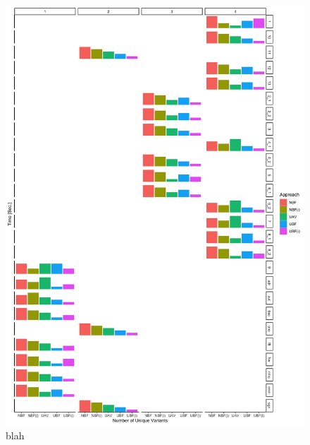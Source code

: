 \begin{figure}
\centering
\includegraphics[scale=0.1] {figs/plots/enron-comp-var.png}
\caption[blah]{blah}
\label{fig:-}
\end{figure}


